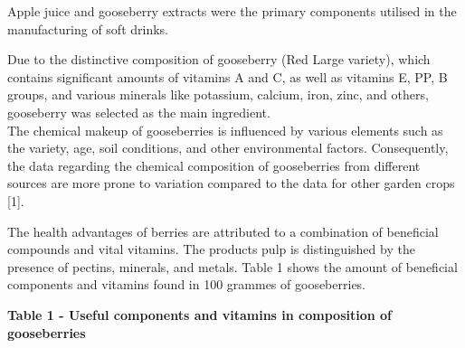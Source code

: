 Apple juice and gooseberry extracts were the primary components utilised
in the manufacturing of soft drinks.~

Due to the distinctive composition of gooseberry (Red Large variety),
which contains significant amounts of vitamins A and C, as well as
vitamins E, PP, B groups, and various minerals like potassium, calcium,
iron, zinc, and others, gooseberry was selected as the main
ingredient.~\\
The chemical makeup of gooseberries is influenced by various elements
such as the variety, age, soil conditions, and other environmental
factors. Consequently, the data regarding the chemical composition of
gooseberries from different sources are more prone to variation compared
to the data for other garden crops {[}1{]}.~

The health advantages of berries are attributed to a combination of
beneficial compounds and vital vitamins. The product\textquotesingle s
pulp is distinguished by the presence of pectins, minerals, and metals.
Table 1 shows the amount of beneficial components and vitamins found in
100 grammes of gooseberries.

{\bfseries Table 1 - Useful components and vitamins in composition of
gooseberries}

